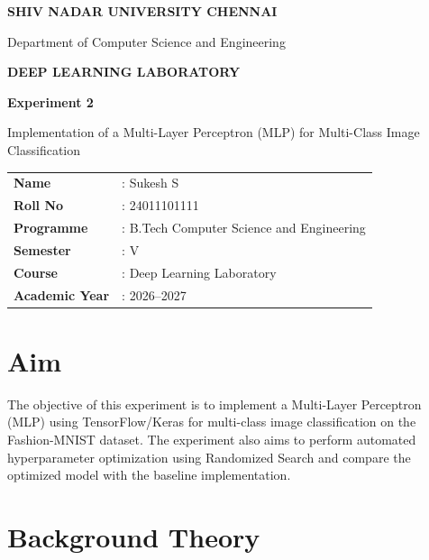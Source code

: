 \documentclass[12pt,a4paper]{article}
\begin{document}
\begin{titlepage}

\begin{center}

{\Large\textbf{SHIV NADAR UNIVERSITY CHENNAI}}

\vspace{0.4cm}

{\large Department of Computer Science and Engineering}

\vspace{1.8cm}

{\Huge\textbf{DEEP LEARNING LABORATORY}}

\vspace{0.8cm}

{\LARGE\textbf{Experiment 2}}

\vspace{0.5cm}

{\Large
Implementation of a Multi-Layer Perceptron (MLP) for Multi-Class Image Classification 
}

\vspace{2cm}

\begin{tabular}{ll}
\textbf{Name} & : Sukesh S\\
\textbf{Roll No} & : 24011101111\\
\textbf{Programme} & : B.Tech Computer Science and Engineering\\
\textbf{Semester} & : V\\
\textbf{Course} & : Deep Learning Laboratory\\
\textbf{Academic Year} & : 2026--2027
\end{tabular}

\vfill

\end{center}

\end{titlepage}

\section{Aim}

The objective of this experiment is to implement a Multi-Layer Perceptron (MLP) using TensorFlow/Keras for multi-class image classification on the Fashion-MNIST dataset. The experiment also aims to perform automated hyperparameter optimization using Randomized Search and compare the optimized model with the baseline implementation.

\section{Background Theory}
\end{document}
